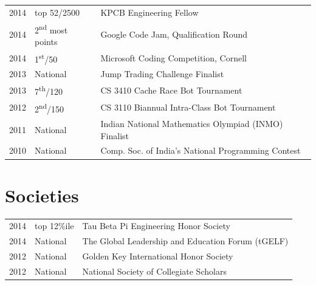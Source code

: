 \documentclass[a4paper]{deedy-resume} %
\begin{document}
\begin{minipage}[t]{0.66\textwidth}
\begin{tabular}{rll}
2014	 & top 52/2500 & KPCB Engineering Fellow\\
2014	 & 2\textsuperscript{nd} most points & Google Code Jam, Qualification Round\\
2014	 & 1\textsuperscript{st}/50 & Microsoft Coding Competition, Cornell\\
2013	 & National & Jump Trading Challenge Finalist\\
2013 & 7\textsuperscript{th}/120 & CS 3410 Cache Race Bot Tournament \\
2012 & 2\textsuperscript{nd}/150 & CS 3110 Biannual Intra-Class Bot Tournament \\
2011 & National & Indian National Mathematics Olympiad (INMO) Finalist \\
2010 & National & Comp. Soc. of India's National Programming Contest\\
\end{tabular}

\sectionspace %


\section{Societies} 

\begin{tabular}{rll}
2014 & top 12\%ile & Tau Beta Pi Engineering Honor Society\\
2014 & National & The Global Leadership and Education Forum (tGELF)\\
2012 & National & Golden Key International Honor Society\\
2012 & National & National Society of Collegiate Scholars\\
\end{tabular}

\sectionspace %


\end{minipage} %

\end{document}
